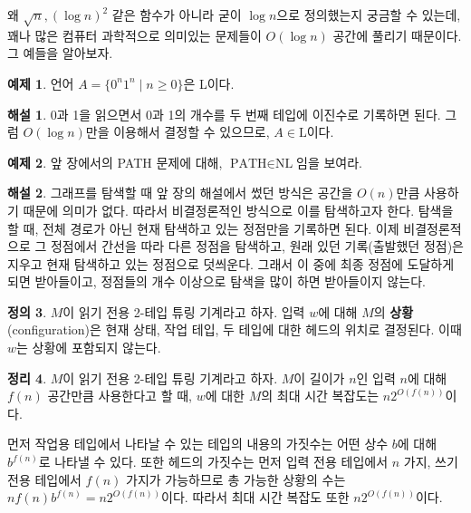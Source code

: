 \documentclass[a4paper, 11pt]{article}
\theoremstyle{definition}
\newtheorem{defn}{정의}[section]
\newtheorem{thm}[defn]{정리}
\newtheorem{ex}[defn]{예제}
\newtheorem*{ans*}{해설}
\newenvironment{pf*}{\pushQED{\qed}\pf}
{\popQED\endpf}
\begin{document}
왜 $\sqrt{n}, (\log{n})^2$ 같은 함수가 아니라 굳이 $\log{n}$으로 정의했는지 궁금할 수 있는데, 꽤나 많은 컴퓨터 과학적으로 의미있는 문제들이 $O(\log{n})$ 공간에 풀리기 때문이다. 그 예들을 알아보자.
\begin{ex}
    언어 $A = \{ 0^n 1^n \;\vert\; n \ge 0\}$은 L이다.
\end{ex}
\begin{ans*}
    0과 1을 읽으면서 0과 1의 개수를 두 번째 테입에 이진수로 기록하면 된다. 그럼 $O(\log{n})$만을 이용해서 결정할 수 있으므로, $A \in \text{L}$이다.
\end{ans*}
\begin{ex}\label{PATH NL}
    앞 장에서의 PATH 문제에 대해, $\text{PATH} \in \text{NL}$임을 보여라.
\end{ex}
\begin{ans*}
    그래프를 탐색할 때 앞 장의 해설에서 썼던 방식은 공간을 $O(n)$만큼 사용하기 때문에 의미가 없다. 따라서 비결정론적인 방식으로 이를 탐색하고자 한다. 탐색을 할 때, 전체 경로가 아닌 현재 탐색하고 있는 정점만을 기록하면 된다. 이제 비결정론적으로 그 정점에서 간선을 따라 다른 정점을 탐색하고, 원래 있던 기록(출발했던 정점)은 지우고 현재 탐색하고 있는 정점으로 덧씌운다. 그래서 이 중에 최종 정점에 도달하게 되면 받아들이고, 정점들의 개수 이상으로 탐색을 많이 하면 받아들이지 않는다.
\end{ans*}
\begin{defn}
    $M$이 읽기 전용 2-테입 튜링 기계라고 하자. 입력 $w$에 대해 $M$의 \textbf{상황}(configuration)은 현재 상태, 작업 테입, 두 테입에 대한 헤드의 위치로 결정된다. 이때 $w$는 상황에 포함되지 않는다.
\end{defn}
\begin{thm}\label{n2of(n)}
    $M$이 읽기 전용 2-테입 튜링 기계라고 하자. $M$이 길이가 $n$인 입력 $n$에 대해 $f(n)$ 공간만큼 사용한다고 할 때, $w$에 대한 $M$의 최대 시간 복잡도는  $n2^{O(f(n))}$이다.
\end{thm}
\begin{pf*}
    먼저 작업용 테입에서 나타날 수 있는 테입의 내용의 가짓수는 어떤 상수 $b$에 대해 $b^{f(n)}$로 나타낼 수 있다. 또한 헤드의 가짓수는 먼저 입력 전용 테입에서 $n$ 가지, 쓰기 전용 테입에서 $f(n)$ 가지가 가능하므로 총 가능한 상황의 수는 $n f(n) b^{f(n)} = n 2^{O(f(n))}$이다. 따라서 최대 시간 복잡도 또한 $n 2^{O(f(n))}$이다.
\end{pf*}
\end{document}

